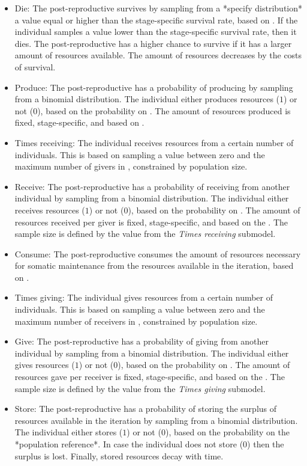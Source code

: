 \documentclass{article}
\begin{document}
\begin{itemize}
    \item Die: The post-reproductive survives by sampling from a *specify distribution* a value equal or higher than the stage-specific survival rate, based on \cite{gurven2007longevity}. If the individual samples a value lower than the stage-specific survival rate, then it dies. The post-reproductive has a higher chance to survive if it has a larger amount of resources available. The amount of resources decreases by the costs of survival.
    \item Produce: The post-reproductive has a probability of producing by sampling from a binomial distribution. The individual either produces resources ($1$) or not ($0$), based on the probability on \cite{koster2020life}. The amount of resources produced is fixed, stage-specific, and based on \cite{koster2020life}.
    \item Times receiving: The individual receives resources from a certain number of individuals. This is based on sampling a value between zero and the maximum number of givers in \cite{gurven2004give}, constrained by population size.
    \item Receive: The post-reproductive has a probability of receiving from another individual by sampling from a binomial distribution. The individual either receives resources ($1$) or not ($0$), based on the probability on \cite{gurven2004give}. The amount of resources received per giver is fixed, stage-specific, and based on the \cite{gurven2004give}. The sample size is defined by the value from the \emph{Times receiving} submodel. 
    \item Consume: The post-reproductive consumes the amount of resources necessary for somatic maintenance from the resources available in the iteration, based on \cite{kaplan2000theory}.
    \item Times giving: The individual gives resources from a certain number of individuals. This is based on sampling a value between zero and the maximum number of receivers in \cite{gurven2004give}, constrained by population size.
    \item Give: The post-reproductive has a probability of giving from another individual by sampling from a binomial distribution. The individual either gives resources ($1$) or not ($0$), based on the probability on \cite{gurven2004give}. The amount of resources gave per receiver is fixed, stage-specific, and based on the \cite{gurven2004give}. The sample size is defined by the value from the \emph{Times giving} submodel. 
    \item Store: The post-reproductive has a probability of storing the surplus of resources available in the iteration by sampling from a binomial distribution. The individual either stores ($1$) or not ($0$), based on the probability on the *population reference*. In case the individual does not store ($0$) then the surplus is lost. Finally, stored resources decay with time.
\end{itemize}



\end{document}
